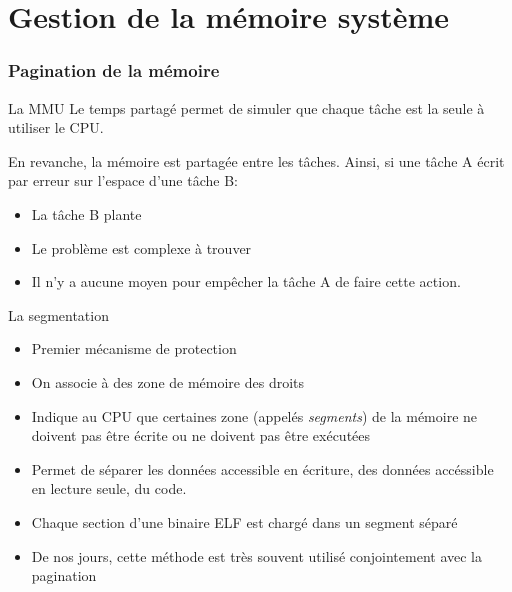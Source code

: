 %
%
%

\part{Gestion de la mémoire système}

\begin{frame}
\partpage
\end{frame}

\begin{frame}
\tableofcontents[currentpart]
\end{frame}

\section{Pagination de la mémoire}

\begin{frame}{La MMU}
  Le temps partagé  permet de simuler que chaque tâche  est la seule à
  utiliser le CPU.

  En revanche, la mémoire est partagée entre les tâches. Ainsi, si une
  tâche A écrit par erreur sur l'espace d'une tâche B:
  \begin{itemize}
  \item  La tâche B plante
  \item  Le problème est complexe à trouver
  \item Il  n'y a  aucune moyen  pour empêcher la  tâche A  de faire
    cette action.
  \end{itemize}
\end{frame}

\begin{frame}[fragile=singleslide]{La segmentation}
  \begin{itemize}
    \item Premier mécanisme de protection
    \item On associe à des zone de mémoire des droits
    \item Indique au CPU  que certaines zone (appelés \emph{segments})
      de la mémoire ne doivent pas  être écrite ou ne doivent pas être
      exécutées
    \item Permet  de séparer les  données accessible en  écriture, des
      données accéssible en lecture seule, du code.
    \item Chaque section d'une binaire ELF est  chargé dans un
      segment séparé
    \item  De  nos  jours,  cette  méthode est  très  souvent  utilisé
      conjointement avec la pagination
  \end{itemize}
\end{frame}

